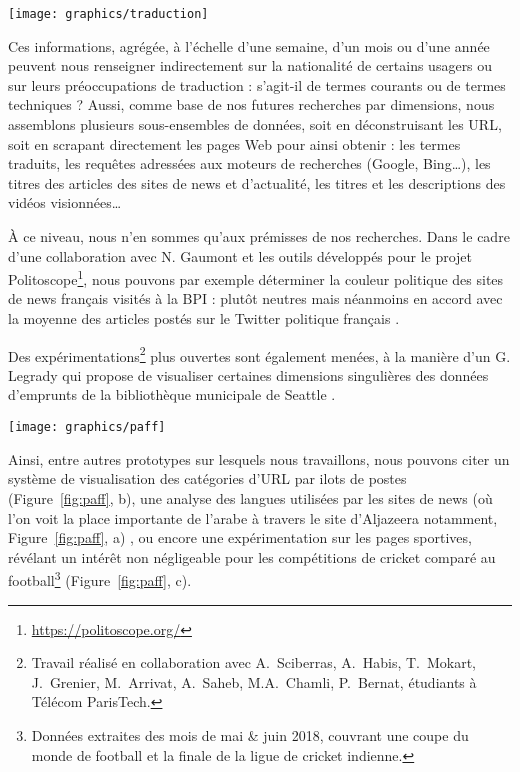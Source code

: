 \documentclass[symmetric,justified,marginals=raggedouter]{tufte-book}
\begin{document}
\begin{figure*}
  \texttt{[image: graphics/traduction]}
  \caption{Exemple d'url du site de traduction linguee, pour le mot mémoire, du français vers l'anglais}
  \label{fig:traduction}
\end{figure*} 

\noindent Ces informations, agrégée, à l'échelle d'une semaine, d'un mois ou d'une année peuvent nous renseigner indirectement sur la nationalité de certains usagers ou sur leurs préoccupations de traduction : s'agit-il de termes courants ou de termes techniques ? Aussi, comme base de nos futures recherches par dimensions, nous assemblons plusieurs sous-ensembles de données, soit en déconstruisant les URL, soit en scrapant directement les pages Web pour ainsi obtenir : les termes traduits, les requêtes adressées aux moteurs de recherches (Google, Bing\ldots{}), les titres des articles des sites de news et d'actualité, les titres et les descriptions des vidéos visionnées\ldots{}

À ce niveau, nous n'en sommes qu'aux prémisses de nos recherches. Dans le cadre d'une collaboration avec N. Gaumont et les outils développés pour le projet Politoscope\footnote{\RaggedOuter \url{https://politoscope.org/}}, nous pouvons par exemple déterminer la couleur politique des sites de news français visités à la BPI : plutôt neutres mais néanmoins en accord avec la moyenne des articles postés sur le Twitter politique français \citep{gaumont_methods_2017}. 

Des expérimentations\footnote{\RaggedOuter Travail réalisé en collaboration avec A.~Sciberras, A.~Habis, T.~Mokart, J.~Grenier, M.~Arrivat, A.~Saheb, M.A.~Chamli, P.~Bernat, étudiants à Télécom ParisTech.} plus ouvertes sont également menées, à la manière d'un G. Legrady qui propose de visualiser certaines dimensions singulières des données d'emprunts de la bibliothèque municipale de Seattle \citep{legrady_making_2005}.

\begin{figure*}
  \texttt{[image: graphics/paff]}
  \caption{Prototypes de systèmes de visualisations, basés sur des dimensions particulières des logs de la BPI}
  \label{fig:paff}
\end{figure*}

\noindent Ainsi, entre autres prototypes sur lesquels nous travaillons, nous pouvons citer un système de visualisation des catégories d'URL par ilots de postes (Figure~\ref{fig:paff}, b), une analyse des langues utilisées par les sites de news (où l'on voit la place importante de l'arabe à travers le site d'Aljazeera notamment, Figure~\ref{fig:paff}, a) , ou encore une expérimentation sur les pages sportives, révélant un intérêt non négligeable pour les compétitions de cricket comparé au football\footnote{\RaggedOuter Données extraites des mois de mai \& juin 2018, couvrant une coupe du monde de football et la finale de la ligue de cricket indienne.} (Figure~\ref{fig:paff}, c).
\end{document}
